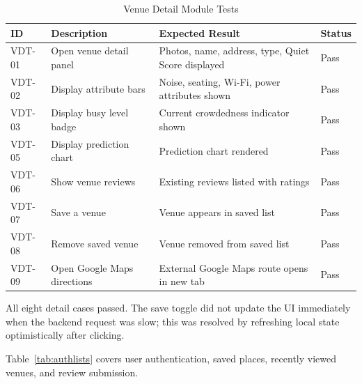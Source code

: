 \documentclass[conference]{IEEEtran}
\begin{document}
\begin{table}[htbp]
\caption{Venue Detail Module Tests}
\label{tab:venuedetail}
\begin{center}
\scriptsize
\setlength{\tabcolsep}{1pt}
\begin{tabular}{@{}|p{}|p{}|p{}|p{}|@{}}
\hline
\textbf{ID} & \textbf{Description} & \textbf{Expected Result} & \textbf{Status} \\
\hline
VDT-01 & Open venue detail panel & Photos, name, address, type, Quiet Score displayed & Pass \\
\hline
VDT-02 & Display attribute bars & Noise, seating, Wi-Fi, power attributes shown & Pass \\
\hline
VDT-03 & Display busy level badge & Current crowdedness indicator shown & Pass \\
\hline
VDT-05 & Display prediction chart & Prediction chart rendered & Pass \\
\hline
VDT-06 & Show venue reviews & Existing reviews listed with ratings & Pass \\
\hline
VDT-07 & Save a venue & Venue appears in saved list & Pass \\
\hline
VDT-08 & Remove saved venue & Venue removed from saved list & Pass \\
\hline
VDT-09 & Open Google Maps directions & External Google Maps route opens in new tab & Pass \\
\hline
\end{tabular}
\end{center}
\end{table}

All eight detail cases passed. The save toggle did not update the UI immediately when the backend request was slow; this was resolved by refreshing local state optimistically after clicking.

Table~\ref{tab:authlists} covers user authentication, saved places, recently viewed venues, and review submission.
\end{document}
